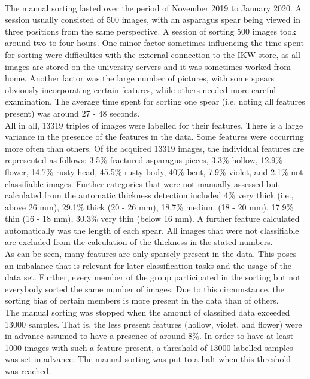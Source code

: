 \\
The manual sorting lasted over the period of November 2019 to January 2020.
A session usually consisted of 500 images, with an asparagus spear being viewed in three positions from the same perspective. A session of sorting 500 images took around two to four hours. One minor factor sometimes influencing the time spent for sorting were difficulties with the external connection to the IKW store, as all images are stored on the university servers and it was sometimes worked from home. Another factor was the large number of pictures, with some spears obviously incorporating certain features, while others needed more careful examination. The average time spent for sorting one spear (i.e. noting all features present) was around 27 - 48 seconds. \\
All in all, 13319 triples of images were labelled for their features.
There is a large variance in the presence of the features in the data. Some features were occurring more often than others. Of the acquired 13319 images, the individual features are represented as follows: 3.5\% fractured asparagus pieces, 3.3\% hollow, 12.9\% flower, 14.7\% rusty head, 45.5\% rusty body, 40\% bent, 7.9\% violet, and 2.1\% not classifiable images. Further categories that were not manually assessed but calculated from the automatic thickness detection included 4\% very thick (i.e., above 26 mm), 29.1\% thick (20 - 26 mm), 18,7\% medium (18 - 20 mm), 17.9\% thin (16 - 18 mm), 30.3\% very thin (below 16 mm). A further feature calculated automatically was the length of each spear. All images that were not classifiable are excluded from the calculation of the thickness in the stated numbers. \\
As can be seen, many features are only sparsely present in the data. This poses an imbalance that is relevant for later classification tasks and the usage of the data set.
Further, every member of the group participated in the sorting but not everybody sorted the same number of images. Due to this circumstance, the sorting bias of certain members is more present in the data than of others. \\
The manual sorting was stopped when the amount of classified data exceeded 13000 samples. That is, the less present features (hollow, violet, and flower) were in advance assumed to have a presence of around 8\%. In order to have at least 1000 images with such a feature present, a threshold of 13000 labelled samples was set in advance. The manual sorting was put to a halt when this threshold was reached. \\
